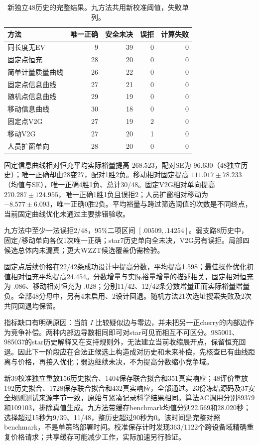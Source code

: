 \documentclass[UTF8,fontset=fandol,11pt,a4paper]{ctexart}
\begin{document}
\begin{table}[htbp]
 \centering\small
 \caption{新独立48历史的完整结果。九方法共用新校准阈值，失败单列。}
 \label{evf:formal48}
 \begin{tabular}{lrrrr}
 \toprule
 方法 & 唯一正确 & 安全未决 & 误拒 & 计算失败\\
 \midrule
同长度无EV & 9 & 39 & 0 & 0\\
固定点恒充 & 28 & 20 & 0 & 0\\
简单计量质量曲线 & 26 & 22 & 0 & 0\\
固定点信息曲线 & 27 & 21 & 0 & 0\\
随机点信息曲线 & 29 & 19 & 0 & 0\\
移动信息曲线 & 30 & 18 & 0 & 0\\
固定点V2G & 27 & 19 & 2 & 0\\
移动V2G & 27 & 20 & 1 & 0\\
人员扩窗单向 & 28 & 20 & 0 & 0\\
\bottomrule
 \end{tabular}
\end{table}

固定信息曲线相对恒充平均实际裕量提高 $268.523$，配对SE为 $96.630$（48独立历史）；唯一正确却由28变27，配对1胜2负。移动相对固定提高 $111.017\pm78.233$（均值与SE），唯一正确4胜1负、总计30/48。固定V2G相对单向提高 $270.287\pm124.955$，唯一正确1胜1负且误拒2；人员扩窗相对移动为 $-8.577\pm6.093$，唯一正确0胜2负。平均裕量与跨过筛选阈值的次数是不同终点，当前固定曲线优化未通过主要排错验收。

九方法中至少一法误拒2/48，95\%二项区间 $[.00509,.14254]$。弱支路8历史中，固定/移动单向各仅1次唯一正确；star7历史单向全未决，V2G另有误拒。局部四候选总体内未漏真；更大WZZT候选覆盖仍需检验。

固定点后续价格在22/42条成功设计中提高分数，平均提高1.598；最佳操作优化初值相对恒充平均提高24.454。分数增量与实际裕量增量的描述相关，固定相对恒充为 $.086$、移动相对恒充为 $.028$；分别11/42、12/42条分数增量正而实际裕量增量负。全部48分母中，另有4未启用、2设计回退。随机方法21次选址搜索失败及2次共同回退均保留。

指标缺口有明确原因：当前 $I$ 比较疑似边与零边，并未把另一正cherry的内部边作为竞争补偿。两种内部边导数相同即可对star可见而相互不可区分。985001、985037的star历史解释又在支持规则外，无法建立当前收缩展开点，保留恒充回退。因此下一阶段应在合法正候选上构造成对历史和未来补偿，先核查已有曲线距离与价格，再接入优化；弱边继续未决，不为提高分数缩小竞争域。

新39校准独立重放156历史拟合、1404保存联合拟合和351真实响应；48评价重放192历史拟合、1728保存联合拟合和432真实响应，全部通过。23份冻结源码及37安全规则测试来源字节一致，原始与紧凑记录科学结果相同。算法AC调用分别89379和109103，排除真值生成。九方法带缓存benchmark均值分别22.569和28.020秒；选择超过15秒为9/39、11/48，整历史超过90秒为0。该时间是完整对照benchmark，不是单策略部署时间。校准保存计时发现363/1122个跨设备域精确重复价格请求；共享缓存可能减少工作，实际加速另行验证。
\end{document}

